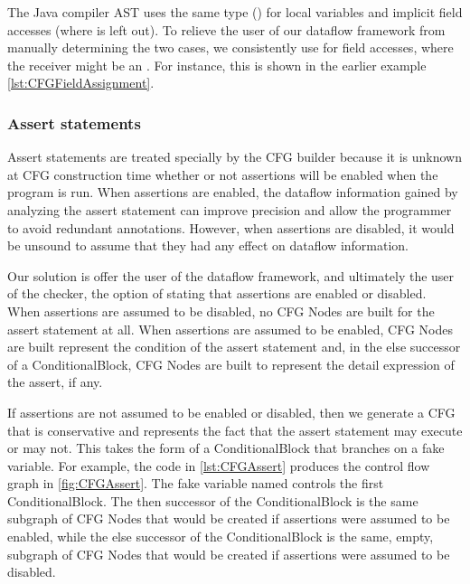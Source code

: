 The Java compiler AST uses the same type () for local variables
and implicit field accesses (where  is left out).
To relieve the user of our dataflow framework from manually determining
the two cases, we consistently use  for field accesses,
where the receiver might be an .
For instance, this is shown in the earlier example \autoref{lst:CFGFieldAssignment}.


\subsubsection{Assert statements}
\label{sec:assert-stmts}

Assert statements are treated specially by the CFG builder because it is unknown at CFG construction time whether or not assertions will be enabled when the program is run.  When assertions are enabled, the dataflow information gained by analyzing the assert statement can improve precision and allow the programmer to avoid redundant annotations.  However, when assertions are disabled, it would be unsound to assume that they had any effect on dataflow information.

Our solution is offer the user of the dataflow framework, and ultimately the user of the checker, the option of stating that assertions are enabled or disabled.  When assertions are assumed to be disabled, no CFG Nodes are built for the assert statement at all.  When assertions are assumed to be enabled, CFG Nodes are built represent the condition of the assert statement and, in the else successor of a ConditionalBlock, CFG Nodes are built to represent the detail expression of the assert, if any.

If assertions are not assumed to be enabled or disabled, then we generate a CFG that is conservative and represents the fact that the assert statement may execute or may not.  This takes the form of a ConditionalBlock that branches on a fake variable.  For example, the code in \autoref{lst:CFGAssert} produces the control flow graph in \autoref{fig:CFGAssert}.  The fake variable named  controls the first ConditionalBlock.  The then successor of the ConditionalBlock is the same subgraph of CFG Nodes that would be created if assertions were assumed to be enabled, while the else successor of the ConditionalBlock is the same, empty, subgraph of CFG Nodes that would be created if assertions were assumed to be disabled.


